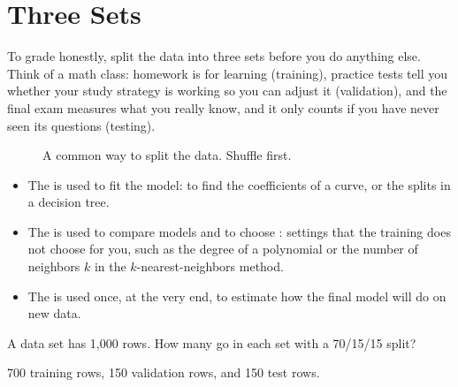 \section{Three Sets}
To grade honestly, split the data into three sets before you do anything else. Think of a math class:
homework is for learning (training), practice tests tell you whether your study strategy is working so you
can adjust it (validation), and the final exam measures what you really know, and it only counts if you have
never seen its questions (testing).

\begin{figure}[H]
\centering
{}
\caption{A common way to split the data. Shuffle first.}
\label{fig:three-sets}
\end{figure}

\begin{itemize}
\item The  is used to fit the model: to find the coefficients of a curve, or the splits
in a decision tree.
\item The  is used to compare models and to choose
: settings that the training does not choose for you, such as
the degree of a polynomial or the number of neighbors $k$ in the $k$-nearest-neighbors method.
\item The  is used once, at the very end, to estimate how the final model will do on new
data.
\end{itemize}

\begin{Worked}
\begin{Problem}
A data set has 1,000 rows. How many go in each set with a 70/15/15 split?
\end{Problem}
\begin{Solution}
700 training rows, 150 validation rows, and 150 test rows.
\end{Solution}
\end{Worked}

